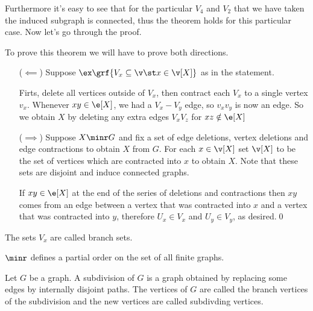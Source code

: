 Furthermore it's easy to see that for the particular $V_4$ and $V_2$ that we have taken the induced subgraph is connected, thus the theorem holds for this particular case. Now let's go through the proof.
\begin{prf}
    To prove this theorem we will have to prove both directions.
    \begin{itemize}
        \item [($\impliedby$)] Suppose $\ex \grf{V_x \subseteq \v \st x \in \v[X]}$ as in the statement.
        
        Firts, delete all vertices outside of $V_x$, then contract each $V_x$ to a single vertex $v_x$. Whenever $xy \in \e[X]$, we had a $V_x - V_y$ edge, so $v_xv_y$ is now an edge. So we obtain $X$ by deleting any extra edges $V_xV_z$ for $xz \notin \e[X]$
        \item [($\implies$)] Suppose $X \minr G$ and fix a set of edge deletions, vertex deletions and edge contractions to obtain $X$ from $G$. For each $x \in \v[X]$ set $\v[X]$ to be the set of vertices which are contracted into $x$ to obtain $X$. Note that these sets are disjoint and induce connected graphs.
        
        If $xy \in \e[X]$ at the end of the series of deletions and contractions then $xy$ comes from an edge between a vertex that was contracted into $x$ and a vertex that was contracted into $y$, therefore $U_x \in V_x$ and $U_y \in V_y$, as desired.\qed
    \end{itemize}
\end{prf}
The sets $V_x$ are called branch sets.
\begin{customproposition}{1.26}
    \label{proposition:1.26}
    $\minr$ defines a partial order on the set of all finite graphs.
\end{customproposition}
Let $G$ be a graph. A subdivision of $G$ is a graph obtained by replacing some edges by internally disjoint paths. The vertices of $G$ are called the branch vertices of the subdivision and the new vertices are called subdivding vertices.

